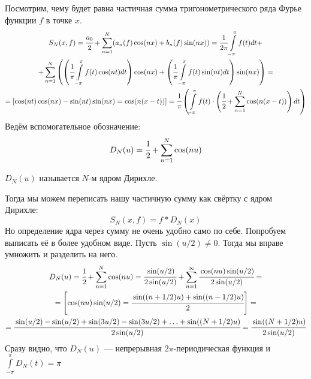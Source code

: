 Посмотрим, чему будет равна частичная сумма тригонометрического ряда Фурье функции $f$ в точке $x$.
\begin{gather}
	S_N(x,f) = \cfrac{a_0}{2} + \sum\limits_{n=1}^{N}(a_n(f) \cos(nx) + b_n(f) \sin(nx)) = \cfrac{1}{2\pi}\int\limits_{-\pi}^{\pi} f(t)dt +\\
	+\sum\limits_{n=1}^{N}\left(\left( \cfrac{1}{\pi}\int\limits_{-\pi}^{\pi}f(t)\cos(nt) dt\right)\cos(nx) +
	\left( \cfrac{1}{\pi}\int\limits_{-\pi}^{\pi}f(t)\sin(nt) dt\right)\sin(nx) \right) = \\
	= [\cos(nt)\cos(nx) - \sin(nt)\sin(nx) = \cos(n(x-t))] 
	=\cfrac{1}{\pi}\left( \int\limits_{-\pi}^{\pi}f(t) \cdot \left( \cfrac{1}{2} + \sum \limits_{n=1}^{N}\cos(n(x-t))\right)dt\right)
\end{gather}
Ведём вспомогательное обозначение:
$$
	D_N(u) = \cfrac{1}{2} + \sum\limits_{n=1}^{N}\cos(nu)
$$
\begin{Def}
	$D_N(u)$ называется $N$-м ядром Дирихле. 
\end{Def}
Тогда мы можем переписать нашу частичную сумму как свёртку с ядром Дирихле:
$$
	S_N(x, f) = f*D_N(x)
$$
Но определение ядра через сумму не очень удобно само по себе. Попробуем выписать её в более удобном виде. Пусть $\sin(u/2) \neq 0$. Тогда мы вправе умножить и разделить на него.
\begin{gather}
	D_N(u) = \cfrac{1}{2} + \sum\limits_{n=1}^{N}\cos(nu) = \cfrac{\sin(u/2)}{2\sin(u/2)} + \sum\limits_{n=1}^{\infty} \cfrac{\cos(nu)\sin(u/2)}{2\sin(u/2)} =\\
	= \left[\cos(nu)\sin(u/2) = \cfrac{\sin((n + 1/2)u) + \sin((n-1/2)u)}{2}\right]=\\
	= \cfrac{\sin(u/2) - \sin(u/2) + \sin(3u/2) - \sin(3u/2) + \ldots + \sin((N + 1/2)u)}{2\sin(u/2)} = \cfrac{\sin((N + 1/2)u)}{2\sin(u/2)}
\end{gather}
Сразу видно, что $D_N(u)$ --- непрерывная $2\pi$-периодическая функция и $\int\limits_{-\pi}^{\pi}D_N(t) = \pi$